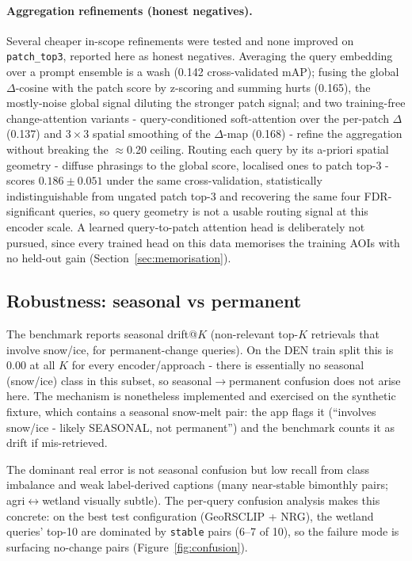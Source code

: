 \documentclass{article}
\begin{document}
\paragraph{Aggregation refinements (honest negatives).}
Several cheaper in-scope refinements were tested and none improved on
\texttt{patch\_top3}, reported here as honest negatives. Averaging the query
embedding over a prompt ensemble is a wash (0.142 cross-validated mAP); fusing
the global $\Delta$-cosine with the patch score by z-scoring and summing hurts
(0.165), the mostly-noise global signal diluting the stronger patch signal; and
two training-free change-attention variants - query-conditioned soft-attention
over the per-patch $\Delta$ (0.137) and $3\times3$ spatial smoothing of the
$\Delta$-map (0.168) - refine the aggregation without breaking the
$\approx$0.20 ceiling. Routing each query by its a-priori spatial geometry -
diffuse phrasings to the global score, localised ones to patch top-3 - scores
$0.186 \pm 0.051$ under the same cross-validation, statistically
indistinguishable from ungated patch top-3 and recovering the same four
FDR-significant queries, so query geometry is not a usable routing signal at this
encoder scale. A learned query-to-patch attention head is deliberately not
pursued, since every trained head on this data memorises the training AOIs with
no held-out gain (Section~\ref{sec:memorisation}).

\subsection{Robustness: seasonal vs permanent}
\label{sec:robustness}

The benchmark reports seasonal drift@$K$ (non-relevant top-$K$ retrievals that
involve snow/ice, for permanent-change queries). On the DEN train split this is
0.00 at all $K$ for every encoder/approach - there is essentially no seasonal
(snow/ice) class in this subset, so seasonal$\rightarrow$permanent confusion does
not arise here. The mechanism is nonetheless implemented and exercised on the
synthetic fixture, which contains a seasonal snow-melt pair: the app flags it
(``involves snow/ice - likely SEASONAL, not permanent'') and the benchmark
counts it as drift if mis-retrieved.

The dominant real error is not seasonal confusion but low recall from class
imbalance and weak label-derived captions (many near-stable bimonthly pairs;
agri$\leftrightarrow$wetland visually subtle). The per-query confusion analysis
makes this concrete: on the best test
configuration (GeoRSCLIP + NRG), the wetland queries' top-10 are dominated by
\texttt{stable} pairs (6--7 of 10), so the failure mode is surfacing no-change
pairs (Figure~\ref{fig:confusion}).
\end{document}
